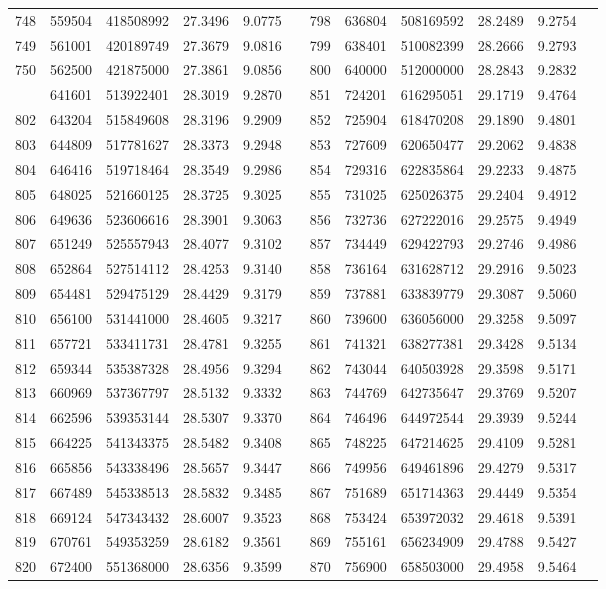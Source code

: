\begin{longtable}{SSSSSSSSSSSS}
748&559504&418508992&27.3496&9.0775&&798&636804&508169592&28.2489&9.2754\\
749&561001&420189749&27.3679&9.0816&&799&638401&510082399&28.2666&9.2793\\
750&562500&421875000&27.3861&9.0856&&800&640000&512000000&28.2843&9.2832\\
&641601&513922401&28.3019&9.2870&&851&724201&616295051&29.1719&9.4764\\
802&643204&515849608&28.3196&9.2909&&852&725904&618470208&29.1890&9.4801\\
803&644809&517781627&28.3373&9.2948&&853&727609&620650477&29.2062&9.4838\\
804&646416&519718464&28.3549&9.2986&&854&729316&622835864&29.2233&9.4875\\
805&648025&521660125&28.3725&9.3025&&855&731025&625026375&29.2404&9.4912\\
806&649636&523606616&28.3901&9.3063&&856&732736&627222016&29.2575&9.4949\\
807&651249&525557943&28.4077&9.3102&&857&734449&629422793&29.2746&9.4986\\
808&652864&527514112&28.4253&9.3140&&858&736164&631628712&29.2916&9.5023\\
809&654481&529475129&28.4429&9.3179&&859&737881&633839779&29.3087&9.5060\\
810&656100&531441000&28.4605&9.3217&&860&739600&636056000&29.3258&9.5097\\
811&657721&533411731&28.4781&9.3255&&861&741321&638277381&29.3428&9.5134\\
812&659344&535387328&28.4956&9.3294&&862&743044&640503928&29.3598&9.5171\\
813&660969&537367797&28.5132&9.3332&&863&744769&642735647&29.3769&9.5207\\
814&662596&539353144&28.5307&9.3370&&864&746496&644972544&29.3939&9.5244\\
815&664225&541343375&28.5482&9.3408&&865&748225&647214625&29.4109&9.5281\\
816&665856&543338496&28.5657&9.3447&&866&749956&649461896&29.4279&9.5317\\
817&667489&545338513&28.5832&9.3485&&867&751689&651714363&29.4449&9.5354\\
818&669124&547343432&28.6007&9.3523&&868&753424&653972032&29.4618&9.5391\\
819&670761&549353259&28.6182&9.3561&&869&755161&656234909&29.4788&9.5427\\
820&672400&551368000&28.6356&9.3599&&870&756900&658503000&29.4958&9.5464\\

\end{longtable}
